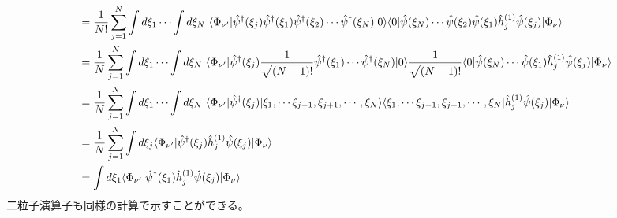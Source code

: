 \documentclass[dvipdfmx, 11pt, a4paper]{jsarticle}
\numberwithin{equation}{section}
\theoremstyle{definition}
\begin{document}
\begin{derivationBox}
\begin{align}
            &= \frac{1}{N!}\sum_{j=1}^N \int d\xi_1 \cdots \int d\xi_N\ \langle \Phi_{\nu'}| \hat{\psi}^\dagger(\xi_j) \hat{\psi}^\dagger (\xi_1) \hat{\psi}^\dagger (\xi_2)\cdots \hat{\psi}^\dagger (\xi_N) |0\rangle \langle 0| \hat{\psi}(\xi_N)\cdots \hat{\psi}(\xi_2)\hat{\psi}(\xi_1) \hat{h}_j^{(1)} \hat{\psi}(\xi_j) |\Phi_\nu \rangle \notag \\
            &= \frac{1}{N}\sum_{j=1}^N \int d\xi_1 \cdots \int d\xi_N\ \langle \Phi_{\nu'}| \hat{\psi}^\dagger(\xi_j) \frac{1}{\sqrt{(N-1)!}}\hat{\psi}^\dagger (\xi_1) \cdots \hat{\psi}^\dagger (\xi_N) |0\rangle \frac{1}{\sqrt{(N-1)!}}\langle 0| \hat{\psi}(\xi_N)\cdots \hat{\psi}(\xi_1) \hat{h}_j^{(1)} \hat{\psi}(\xi_j) |\Phi_\nu \rangle \notag \\
            &= \frac{1}{N}\sum_{j=1}^N \int d\xi_1 \cdots \int d\xi_N\ \langle \Phi_{\nu'}| \hat{\psi}^\dagger(\xi_j) |\xi_1, \cdots \xi_{j-1},\xi_{j+1}, \cdots ,\xi_N \rangle \langle \xi_1, \cdots \xi_{j-1},\xi_{j+1}, \cdots ,\xi_N | \hat{h}_j^{(1)} \hat{\psi}(\xi_j) |\Phi_\nu \rangle \notag \\
            &= \frac{1}{N}\sum_{j=1}^N \int d\xi_j \langle \Phi_{\nu'} |  \hat{\psi}^\dagger(\xi_j) \hat{h}_j^{(1)} \hat{\psi}(\xi_j) | \Phi_\nu \rangle \notag \\
            &= \int d\xi_1 \langle \Phi_{\nu'} |  \hat{\psi}^\dagger(\xi_1) \hat{h}_j^{(1)} \hat{\psi}(\xi_j) | \Phi_\nu \rangle 
        \end{align}
        二粒子演算子も同様の計算で示すことができる。
    \end{derivationBox}
\end{document}
